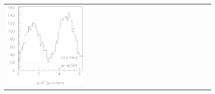 \begin{slide*}
\begin{minipage}[t]{\linewidth}
\begin{center}
\begin{tabular}{p{0.4\linewidth} c p{0.45\linewidth}}
\begin{minipage}{\linewidth}
      \includegraphics[width=\linewidth]{cosmic_phi.eps}
    \end{minipage}
  \end{tabular}
\end{center}

\vspace{0.2 cm}


\end{minipage}
\end{slide*}
